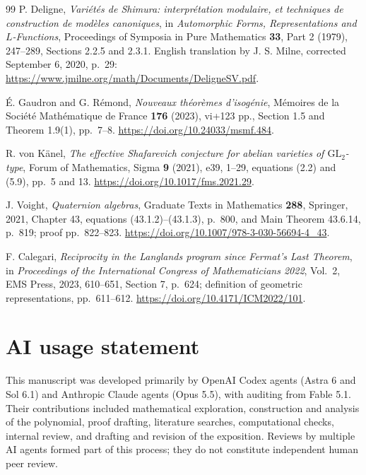 \documentclass[11pt]{article}
\theoremstyle{definition}
\theoremstyle{remark}
\begin{document}
\begin{thebibliography}{99}
 P. Deligne,
\emph{Vari\'et\'es de Shimura: interpr\'etation modulaire, et techniques
de construction de mod\`eles canoniques},
in \emph{Automorphic Forms, Representations and $L$-Functions},
Proceedings of Symposia in Pure Mathematics \textbf{33}, Part 2 (1979),
247--289, Sections 2.2.5 and 2.3.1.
English translation by J. S. Milne, corrected September 6, 2020, p.~29:
\url{https://www.jmilne.org/math/Documents/DeligneSV.pdf}.

 \'E. Gaudron and G. R\'emond,
\emph{Nouveaux th\'eor\`emes d'isog\'enie},
M\'emoires de la Soci\'et\'e Math\'ematique de France \textbf{176} (2023),
vi+123 pp., Section 1.5 and Theorem 1.9(1), pp.~7--8.
\url{https://doi.org/10.24033/msmf.484}.

 R. von K\"anel,
\emph{The effective Shafarevich conjecture for abelian varieties of
$\mathrm{GL}_2$-type}, Forum of Mathematics, Sigma \textbf{9} (2021), e39,
1--29, equations (2.2) and (5.9), pp.~5 and 13.
\url{https://doi.org/10.1017/fms.2021.29}.

 J. Voight, \emph{Quaternion algebras},
Graduate Texts in Mathematics \textbf{288}, Springer, 2021,
Chapter 43, equations (43.1.2)--(43.1.3), p.~800, and
Main Theorem 43.6.14, p.~819; proof pp.~822--823.
\url{https://doi.org/10.1007/978-3-030-56694-4_43}.

 F. Calegari,
\emph{Reciprocity in the Langlands program since Fermat's Last Theorem},
in \emph{Proceedings of the International Congress of Mathematicians 2022},
Vol.~2, EMS Press, 2023, 610--651, Section 7, p.~624;
definition of geometric representations, pp.~611--612.
\url{https://doi.org/10.4171/ICM2022/101}.

\end{thebibliography}


\clearpage
\section*{AI usage statement}
This manuscript was developed primarily by OpenAI Codex agents (Astra 6 and Sol 6.1)
and Anthropic Claude agents (Opus 5.5), with auditing from Fable 5.1.
Their contributions included mathematical
exploration, construction and analysis of the polynomial, proof drafting,
literature searches, computational checks, internal review, and drafting
and revision of the exposition. Reviews by multiple AI agents formed part
of this process; they do not constitute independent human peer review.
\end{document}
